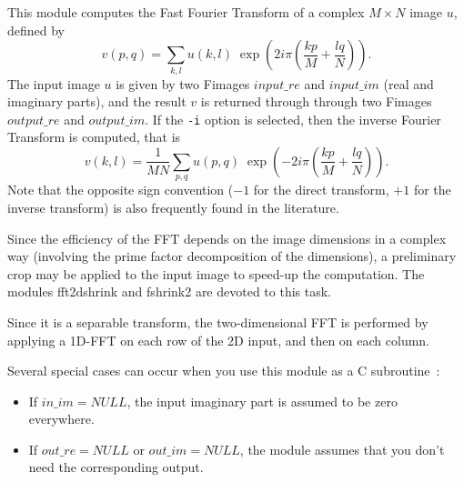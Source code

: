 This module computes the Fast Fourier Transform 
of a complex $M\times N$ image $u$, defined by
$$v(p,q) = \sum_{k,l} u(k,l)\; 
\exp\left(2i\pi \left(\frac{kp}M+\frac{lq}N\right)\right).$$
The input image $u$ is given
by two Fimages $input\_re$ and $input\_im$ (real and imaginary parts),
and the result $v$ is returned through through two Fimages
$output\_re$ and $output\_im$. If the \verb+-i+ option is selected,
then the inverse Fourier Transform is computed, that is
$$v(k,l) = \frac 1{MN} \sum_{p,q} u(p,q)\;
\exp\left(-2i\pi \left(\frac{kp}M+\frac{lq}N\right)\right).$$
Note that the opposite sign convention ($-1$ for the direct transform, $+1$ for
the inverse transform) is also frequently found in the literature.

\vskip 0.3cm

Since the efficiency of the FFT depends on the image dimensions in
a complex way (involving the prime factor decomposition of the dimensions),
a preliminary crop may be applied to the input image to speed-up the 
computation. The modules {\sf fft2dshrink} and {\sf fshrink2} are
devoted to this task.

\vskip 0.3cm

Since it is a separable transform, 
the two-dimensional FFT is performed by applying a 1D-FFT on each row
of the 2D input, and then on each column.

\vskip 0.3cm

Several special cases can occur when you use this module as a 
C subroutine~:
\begin{itemize}
\item If $in\_im=NULL$, the input imaginary part is assumed to be zero 
everywhere.
\item If $out\_re=NULL$ or $out\_im=NULL$, the module assumes that you
don't need the corresponding output.
\end{itemize}
